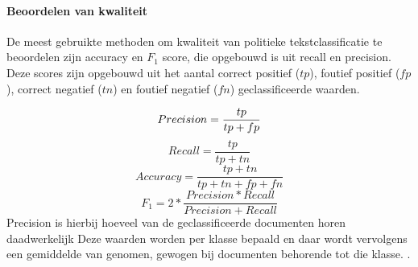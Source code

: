 \paragraph{Beoordelen van kwaliteit}
De meest gebruikte methoden om kwaliteit van politieke tekstclassificatie te beoordelen zijn accuracy en $F_1$ score, die opgebouwd is uit recall en precision. Deze scores zijn opgebouwd uit het aantal correct positief ($tp$), foutief positief ($fp$), correct negatief ($tn$) en foutief negatief ($fn$) geclassificeerde waarden.\par
\begin{equation}
    Precision = \frac{tp}{tp + fp}\\
\end{equation}
\begin{equation}
    Recall = \frac{tp}{tp + tn}
\end{equation}
\begin{equation}
    Accuracy = \frac{tp + tn}{tp + tn + fp + fn}
\end{equation}
\begin{equation}
    F_1 = 2 * \frac{Precision * Recall}{Precision + Recall}
\end{equation}
Precision is hierbij hoeveel van de geclassificeerde documenten horen daadwerkelijk 
Deze waarden worden per klasse bepaald en daar wordt vervolgens een gemiddelde van genomen, gewogen bij documenten behorende tot die klasse.  \cite{Manning:2008:IIR:1394399,scikit-learn}.\par
\bigskip

